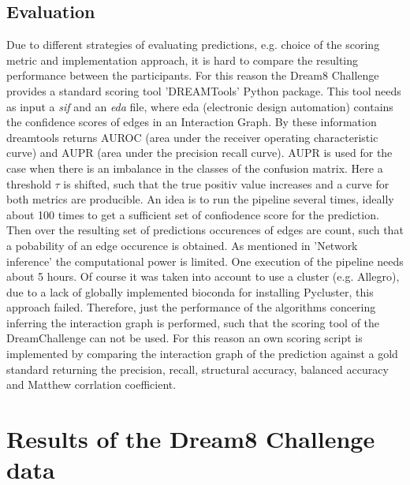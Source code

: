 \subsection*{Evaluation}
Due to different strategies of evaluating predictions, e.g. choice of the scoring metric and implementation approach, it is hard to compare the resulting performance between the participants. For this reason the Dream8 Challenge provides a standard scoring tool 'DREAMTools' Python package.
This tool needs as input a \textit{sif} and an \textit{eda} file, where eda (electronic design automation) contains the confidence scores of edges in an Interaction Graph. By these information dreamtools returns AUROC (area under the receiver operating characteristic curve)  and AUPR (area under the precision recall curve). AUPR is used for the case when there is an imbalance in the classes of the confusion matrix. Here a threshold $\tau$ is shifted, such that the true positiv value increases and a curve for both metrics are producible.
An idea is to run the pipeline several times, ideally about 100 times to get a sufficient set of confiodence score for the prediction. Then over the resulting set of predictions occurences of edges are count, such that a pobability of an edge occurence is obtained. As mentioned in 'Network inference' the computational power is limited. One execution of the pipeline needs about 5 hours. Of course it was taken into account to use a cluster (e.g. Allegro), due to a lack of globally implemented bioconda for installing Pycluster, this approach failed.
Therefore, just the performance of the algorithms concering inferring the interaction graph is performed, such that the scoring tool of the DreamChallenge can not be used. For this reason an own scoring script is implemented by comparing the interaction graph of the prediction against a gold standard returning the precision, recall, structural accuracy, balanced accuracy and Matthew corrlation coefficient. 

\newpage
\section{Results of the Dream8 Challenge data}
